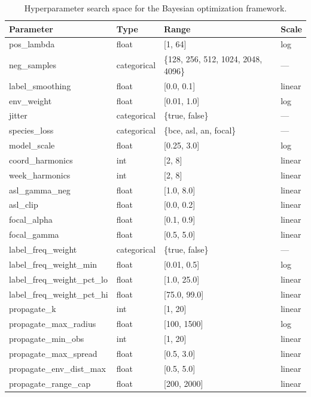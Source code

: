 \begin{table}[H]
\centering
\caption{Hyperparameter search space for the Bayesian optimization framework.}
\label{tab:search-space}
\small
\begin{tabular}{llll}
\toprule
Parameter & Type & Range & Scale \\
\midrule
pos\_lambda & float & [1, 64] & log \\
neg\_samples & categorical & \{128, 256, 512, 1024, 2048, 4096\} & --- \\
label\_smoothing & float & [0.0, 0.1] & linear \\
env\_weight & float & [0.01, 1.0] & log \\
jitter & categorical & \{true, false\} & --- \\
species\_loss & categorical & \{bce, asl, an, focal\} & --- \\
model\_scale & float & [0.25, 3.0] & log \\
coord\_harmonics & int & [2, 8] & linear \\
week\_harmonics & int & [2, 8] & linear \\
asl\_gamma\_neg & float & [1.0, 8.0] & linear \\
asl\_clip & float & [0.0, 0.2] & linear \\
focal\_alpha & float & [0.1, 0.9] & linear \\
focal\_gamma & float & [0.5, 5.0] & linear \\
label\_freq\_weight & categorical & \{true, false\} & --- \\
label\_freq\_weight\_min & float & [0.01, 0.5] & log \\
label\_freq\_weight\_pct\_lo & float & [1.0, 25.0] & linear \\
label\_freq\_weight\_pct\_hi & float & [75.0, 99.0] & linear \\
propagate\_k & int & [1, 20] & linear \\
propagate\_max\_radius & float & [100, 1500] & log \\
propagate\_min\_obs & int & [1, 20] & linear \\
propagate\_max\_spread & float & [0.5, 3.0] & linear \\
propagate\_env\_dist\_max & float & [0.5, 5.0] & linear \\
propagate\_range\_cap & float & [200, 2000] & linear \\
\bottomrule
\end{tabular}
\end{table}


